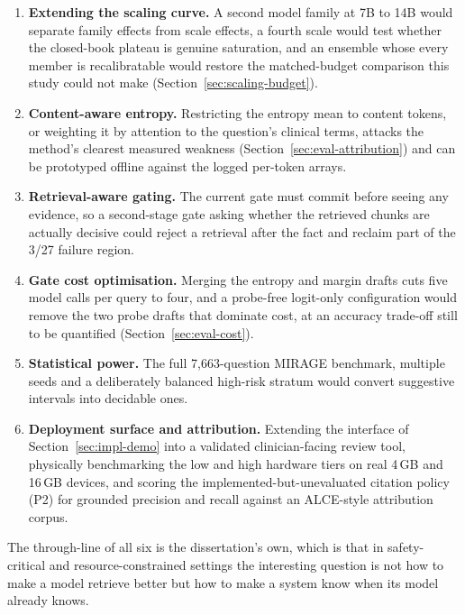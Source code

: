 \begin{enumerate}
  \item \textbf{Extending the scaling curve.} A second model family at 7B to
    14B would separate family effects from scale effects, a fourth scale
    would test whether the closed-book plateau is genuine saturation, and an
    ensemble whose every member is recalibratable would restore the
    matched-budget comparison this study could not make
    (Section~\ref{sec:scaling-budget}).
  \item \textbf{Content-aware entropy.} Restricting the entropy mean to
    content tokens, or weighting it by attention to the question's clinical
    terms, attacks the method's clearest measured weakness
    (Section~\ref{sec:eval-attribution}) and can be prototyped offline against
    the logged per-token arrays.
  \item \textbf{Retrieval-aware gating.} The current gate must commit before
    seeing any evidence, so a second-stage gate asking whether the retrieved
    chunks are actually decisive could reject a retrieval after the fact and
    reclaim part of the 3/27 failure region.
  \item \textbf{Gate cost optimisation.} Merging the entropy and margin
    drafts cuts five model calls per query to four, and a probe-free
    logit-only configuration would remove the two probe drafts that dominate
    cost, at an accuracy trade-off still to be quantified
    (Section~\ref{sec:eval-cost}).
  \item \textbf{Statistical power.} The full 7,663-question MIRAGE benchmark,
    multiple seeds and a deliberately balanced high-risk stratum would
    convert suggestive intervals into decidable ones.
  \item \textbf{Deployment surface and attribution.} Extending the interface of
    Section~\ref{sec:impl-demo} into a validated clinician-facing review tool,
    physically benchmarking the low and high hardware tiers on real 4\,GB and
    16\,GB devices, and scoring the implemented-but-unevaluated citation policy
    (P2) for grounded precision and recall against an ALCE-style attribution
    corpus.
\end{enumerate}

The through-line of all six is the dissertation's own, which is that in
safety-critical and resource-constrained settings the interesting question is
not how to make a model retrieve better but how to make a system know when its
model already knows.